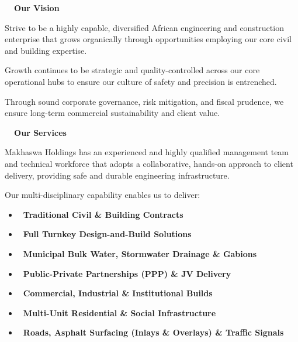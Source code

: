 \documentclass[a4paper,11pt]{article}
\begin{document}
\begin{minipage}[t]{0.48\textwidth}
    {\fontsize{15pt}{18pt}\selectfont\bfseries\color{mhblue}\faEye\ \ Our Vision}
    \vspace{0.25cm}

    {\fontsize{8.2pt}{11.5pt}\selectfont\color{mhtext}
    Strive to be a highly capable, diversified African engineering and construction enterprise that grows organically through opportunities employing our core civil and building expertise.

    \vspace{0.2cm}
    Growth continues to be strategic and quality-controlled across our core operational hubs to ensure our culture of safety and precision is entrenched.

    \vspace{0.2cm}
    Through sound corporate governance, risk mitigation, and fiscal prudence, we ensure long-term commercial sustainability and client value.
    }

    \vspace{0.45cm}

    {\fontsize{15pt}{18pt}\selectfont\bfseries\color{mhblue}\faCogs\ \ Our Services}
    \vspace{0.25cm}

    {\fontsize{8.2pt}{11.5pt}\selectfont\color{mhtext}
    Makhaswa Holdings has an experienced and highly qualified management team and technical workforce that adopts a collaborative, hands-on approach to client delivery, providing safe and durable engineering infrastructure.

    \vspace{0.25cm}
    Our multi-disciplinary capability enables us to deliver:
    \begin{itemize}[leftmargin=12pt, itemsep=2pt, topsep=2pt]
        \item \textbf{\faFileContract\ Traditional Civil \& Building Contracts}
        \item \textbf{\faDraftingCompass\ Full Turnkey Design-and-Build Solutions}
        \item \textbf{\faWater\ Municipal Bulk Water, Stormwater Drainage \& Gabions}
        \item \textbf{\faHandshake\ Public-Private Partnerships (PPP) \& JV Delivery}
        \item \textbf{\faBuilding\ Commercial, Industrial \& Institutional Builds}
        \item \textbf{\faHome\ Multi-Unit Residential \& Social Infrastructure}
        \item \textbf{\faRoad\ Roads, Asphalt Surfacing (Inlays \& Overlays) \& Traffic Signals}
    \end{itemize}
    }
\end{minipage}
\end{document}
